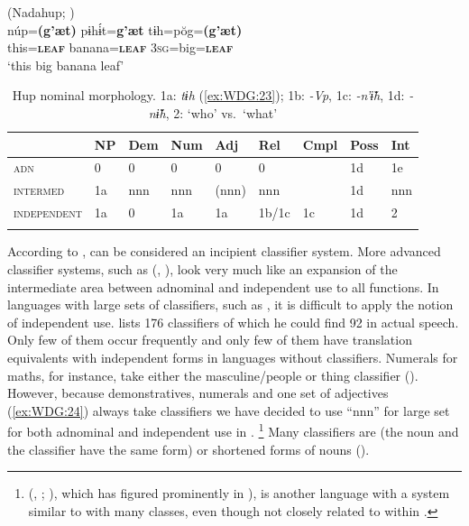 \documentclass[output=collectionpaper]{langsci/langscibook}
\begin{document}
\ea\label{ex:WDG:23}
 (Nadahup; \citealt[278]{Epps2008})\\
\gll núp=\textbf{(g'æt)}	pɨhɨ́t=\textbf{g'æt}	tɨh=pŏg=\textbf{(g'æt)}\\
this=\textbf{\textsc{leaf}}	banana=\textbf{\textsc{leaf}}	3\textsc{sg}=big=\textbf{\textsc{leaf}}\\
\glt `this big banana leaf'\\
\z

\begin{table}
\caption{Hup nominal morphology. 1a: \textit{tɨh} (\ref{ex:WDG:23}); 1b: \textit{-Vp}, 1c: \textit{-n’ɨ̆h}, 1d: \textit{-nɨ̆h}, 2: ‘who’ vs.\ ‘what’\label{tab:WDG:5}}
\begin{tabular}{>{\scshape}l*{8}{l}}
\lsptoprule
&	NP	&	Dem	&	Num	&	Adj	&	Rel	&	Cmpl	&	Poss	&	Int	\\
\midrule
adn	&	0	&	0	&	0	&	0	&	0	&		&	1d	&	1e	\\
intermed	&	1a	&	nnn	&	nnn	&	(nnn)	&	nnn	&		&	1d	&	nnn	\\
independent	&	1a	&	0	&	1a	&	1a	&	1b/1c	&	1c	&	1d	&	2	\\
\lspbottomrule
\end{tabular}
\end{table}

According to \cite[279]{Epps2008},  can be considered an incipient classifier system. More advanced classifier systems, such as  (, ), look very much like an expansion of the intermediate area between adnominal and independent use to all functions. In languages with large sets of classifiers, such as , it is difficult to apply the notion of independent use. \cite[81]{Senft1986} lists 176 classifiers of which he could find 92 in actual speech. Only few of them occur frequently and only few of them have translation equivalents with independent forms in languages without classifiers. Numerals for maths, for instance, take either the masculine/people or thing classifier (\citealt[84]{Senft1986}). However, because demonstratives, numerals and one set of adjectives (\ref{ex:WDG:24}) always take classifiers we have decided to use ``nnn'' for large set for both adnominal and independent use in .%
\footnote{%
 (, ; \citealt{Kayser1993}), which has figured prominently in \citealt[167]{Dixon1982}), is another  language with a system similar to  with many classes, even though not closely related to  within .
} %
Many classifiers are  (the noun and the classifier have the same form) or shortened forms of nouns (\citealt[104]{Senft1993}).
\end{document}
